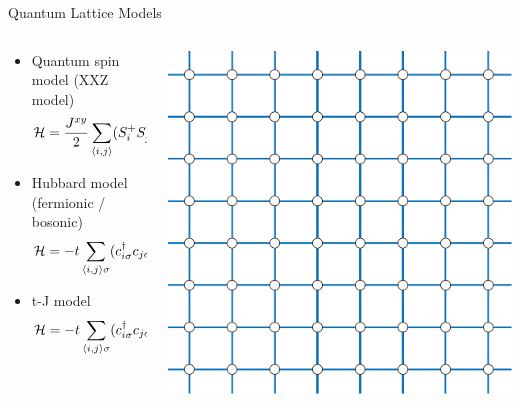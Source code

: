\begin{frame}[fragile]{Quantum Lattice Models}
  \begin{columns}[T]
    \begin{column}{.8\textwidth}
      \begin{itemize}
      \item Quantum spin model (XXZ model)
        \begin{equation*} {\cal H} = \frac{J^{xy}}{2}
          \sum_{\langle i,j \rangle} (S^+_i S^-_j + S^-_i S^+_j) + J^z
          \sum_{\langle i,j \rangle} S^z_i S^z_j
        \end{equation*}
      \item Hubbard model (fermionic / bosonic)
        \begin{equation*} {\cal H} = -t \sum_{\langle i,j \rangle \sigma}
          (c^\dagger_{i\sigma} c_{j\sigma} + \mbox{h.c.}) + U \sum_{i}
          n_{i\uparrow} n_{i\downarrow}
        \end{equation*}
      \item t-J model\begin{equation*} {\cal H} = -t \sum_{\langle i,j \rangle \sigma}
        (c^\dagger_{i\sigma} c_{j\sigma} + \mbox{h.c.}) + J \sum_{i,j}
        ({\bf S}_i \cdot {\bf S}_j - n_{i} n_{j} / 4) \end{equation*}
      \end{itemize}
    \end{column}
    \begin{column}{.2\textwidth}
      \includegraphics[width=\textwidth]{square.pdf}
    \end{column}
  \end{columns}
\end{frame}

